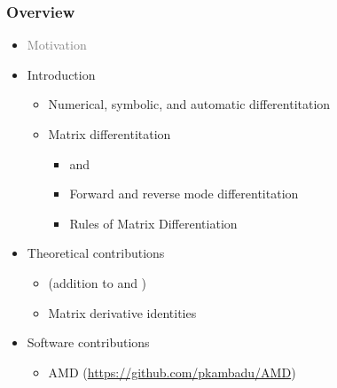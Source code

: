\begin{frame}
\frametitle{Overview}
%
\begin{itemize}
\item \textcolor{gray}{Motivation}
\item Introduction
  \begin{itemize}
  \item Numerical, symbolic, and automatic differentitation
  \item Matrix differentitation
    \begin{itemize}
    \item \textcolor{blue}{} and 
          \textcolor{blue}{}
    \item Forward and reverse mode differentitation
    \item Rules of Matrix Differentiation
    \end{itemize}
  \end{itemize}
\item Theoretical contributions
  \begin{itemize}
  \item {} (addition to  and )
  \item Matrix derivative identities
  \end{itemize}
\item Software contributions
  \begin{itemize}
  \item AMD (\textcolor{blue}{\url{https://github.com/pkambadu/AMD}})
  \end{itemize}
\end{itemize}
%
\end{frame}
